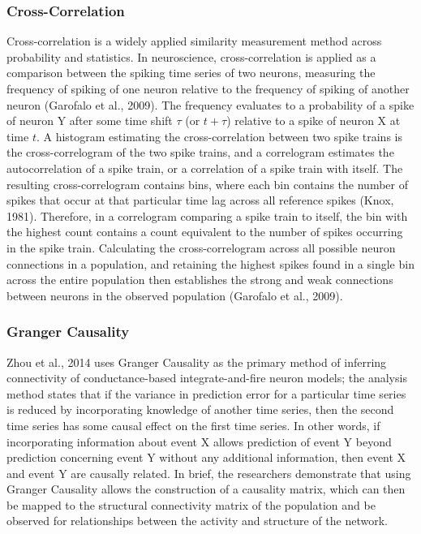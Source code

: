 \documentclass[11pt]{article}
\begin{document}
\subsubsection{Cross-Correlation}
Cross-correlation is a widely applied similarity measurement method across probability and statistics. In neuroscience, cross-correlation is applied as a comparison between the spiking time series of two neurons, measuring the frequency of spiking of one neuron relative to the frequency of spiking of another neuron (Garofalo et al., 2009). The frequency evaluates to a probability of a spike of neuron Y after some time shift $\tau$ (or $t + \tau$) relative to a spike of neuron X at time $t$. A histogram estimating the cross-correlation between two spike trains is the cross-correlogram of the two spike trains, and a correlogram estimates the autocorrelation of a spike train, or a correlation of a spike train with itself. The resulting cross-correlogram contains bins, where each bin contains the number of spikes that occur at that particular time lag across all reference spikes (Knox, 1981). Therefore, in a correlogram comparing a spike train to itself, the bin with the highest count contains a count equivalent to the number of spikes occurring in the spike train. Calculating the cross-correlogram across all possible neuron connections in a population, and retaining the highest spikes found in a single bin across the entire population then establishes the strong and weak connections between neurons in the observed population (Garofalo et al., 2009).

\subsubsection{Granger Causality}
Zhou et al., 2014 uses Granger Causality as the primary method of inferring connectivity of conductance-based integrate-and-fire neuron models; the analysis method states that if the variance in prediction error for a particular time series is reduced by incorporating knowledge of another time series, then the second time series has some causal effect on the first time series. In other words, if incorporating information about event X allows prediction of event Y beyond prediction concerning event Y without any additional information, then event X and event Y are causally related.  In brief, the researchers demonstrate that using Granger Causality allows the construction of a causality matrix, which can then be mapped to the structural connectivity matrix of the population and be observed for relationships between the activity and structure of the network.\par
\end{document}

